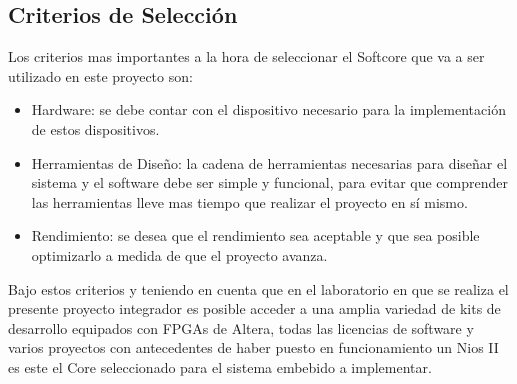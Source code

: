 \subsection{Criterios de Selección}

Los criterios mas importantes a la hora de seleccionar el Softcore que va a ser utilizado en este proyecto son:
\begin{itemize}
	\item Hardware: se debe contar con el dispositivo necesario para la implementación de estos dispositivos.
	\item Herramientas de Diseño: la cadena de herramientas necesarias para diseñar el sistema y el software debe ser simple y funcional, para evitar que comprender las herramientas lleve mas tiempo que realizar el proyecto en sí mismo.
	\item Rendimiento: se desea que el rendimiento sea aceptable y que sea posible optimizarlo a medida de que el proyecto avanza.
\end{itemize}

Bajo estos criterios y teniendo en cuenta que en el laboratorio en que se realiza el presente proyecto integrador es posible acceder a una amplia variedad de kits de desarrollo equipados con FPGAs de Altera, todas las licencias de software y varios proyectos con antecedentes de haber puesto en funcionamiento un Nios II es este el Core seleccionado para el sistema embebido a implementar.

